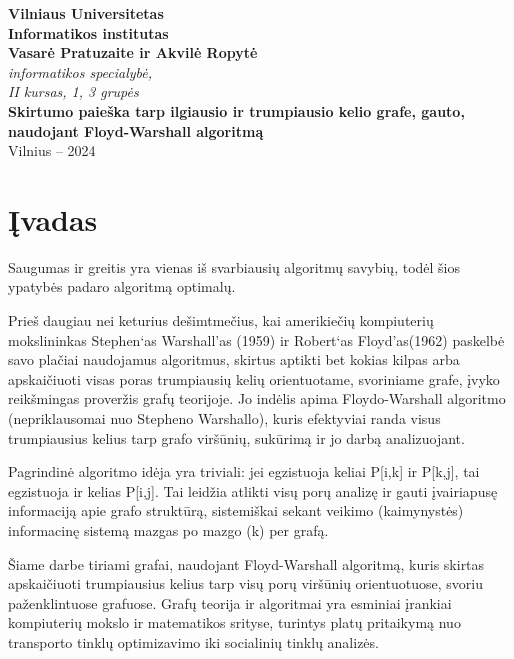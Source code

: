 \documentclass[bibliography=totoc]{article}
\begin{document}
\begin{titlepage}
    \begin{center}
        \vspace*{1cm}
 
        \Huge
        \textbf{Vilniaus Universitetas}\\
         \textbf{Informatikos institutas}\\
        
        \vspace{6.5cm}
        \textbf{Vasarė Pratuzaite ir Akvilė Ropytė}\\
       \textit{ informatikos specialybė, \\
                 II kursas, 1, 3 grupės\\}
        \textbf{Skirtumo paieška tarp ilgiausio ir trumpiausio kelio grafe, gauto, naudojant Floyd-Warshall algoritmą}\\
          
                 
 
        \vfill
        Vilnius -- 2024
    \end{center}
\end{titlepage}
\tableofcontents
\newpage
\section*{Įvadas}
\label{sec:ivadas}

Saugumas ir greitis yra vienas iš svarbiausių algoritmų savybių, todėl šios ypatybės padaro algoritmą optimalų.

Prieš daugiau nei keturius dešimtmečius, kai amerikiečių kompiuterių mokslininkas Stephen‘as Warshall'as (1959) ir  Robert‘as Floyd'as(1962) paskelbė savo plačiai naudojamus algoritmus, skirtus aptikti bet kokias kilpas arba apskaičiuoti visas poras trumpiausių kelių orientuotame, svoriniame grafe, įvyko reikšmingas proveržis grafų teorijoje. Jo indėlis apima Floydo-Warshall algoritmo (nepriklausomai nuo Stepheno Warshallo), kuris efektyviai randa visus trumpiausius kelius tarp grafo viršūnių, sukūrimą ir jo darbą analizuojant.

Pagrindinė algoritmo idėja yra triviali: jei egzistuoja keliai P[i,k] ir P[k,j], tai egzistuoja ir kelias P[i,j]. Tai leidžia atlikti visų porų analizę ir gauti įvairiapusę informaciją apie grafo struktūrą, sistemiškai sekant veikimo (kaimynystės) informacinę sistemą mazgas po mazgo (k) per grafą.

Šiame darbe tiriami grafai, naudojant Floyd-Warshall algoritmą, kuris skirtas apskaičiuoti trumpiausius kelius tarp visų porų viršūnių orientuotuose, svoriu paženklintuose grafuose. Grafų teorija ir algoritmai yra esminiai įrankiai kompiuterių mokslo ir matematikos srityse, turintys platų pritaikymą nuo transporto tinklų optimizavimo iki socialinių tinklų analizės.
\end{document}
